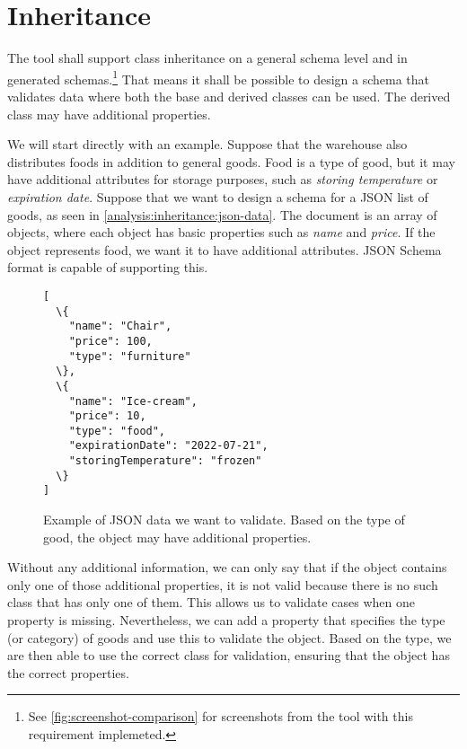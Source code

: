 

\section{Inheritance}

\begin{requirement}
    The tool shall support class inheritance on a general schema level and in generated schemas.\footnote{See \autoref{fig:screenshot-comparison} for screenshots from the tool with this requirement implemeted.} That means it shall be possible to design a schema that validates data where both the base and derived classes can be used. The derived class may have additional properties.
    \label{requirement:inheritance}
\end{requirement}

\begin{showcase}
  We will start directly with an example. Suppose that the warehouse also distributes foods in addition to general goods. Food is a type of good, but it may have additional attributes for storage purposes, such as \textit{storing temperature} or \textit{expiration date}. Suppose that we want to design a schema for a JSON list of goods, as seen in \autoref{analysis:inheritance:json-data}. The document is an array of objects, where each object has basic properties such as \textit{name} and \textit{price}. If the object represents food, we want it to have additional attributes. JSON Schema format is capable of supporting this. %

  \begin{figure}[H]\centering
      \begin{Verbatim}[commandchars=\\\{\}]
[
  \{
    "name": "Chair",
    "price": 100,
    "type": "furniture"
  \},
  \{
    "name": "Ice-cream",
    "price": 10,
    "type": "food",
    "expirationDate": "2022-07-21",
    "storingTemperature": "frozen"
  \}
]
      \end{Verbatim}
      \caption{Example of JSON data we want to validate. Based on the type of good, the object may have additional properties.}
      \label{analysis:inheritance:json-data}
  \end{figure}

  Without any additional information, we can only say that if the object contains only one of those additional properties, it is not valid because there is no such class that has only one of them. This allows us to validate cases when one property is missing. Nevertheless, we can add a property that specifies the type (or category) of goods and use this to validate the object. Based on the type, we are then able to use the correct class for validation, ensuring that the object has the correct properties.
\end{showcase}

